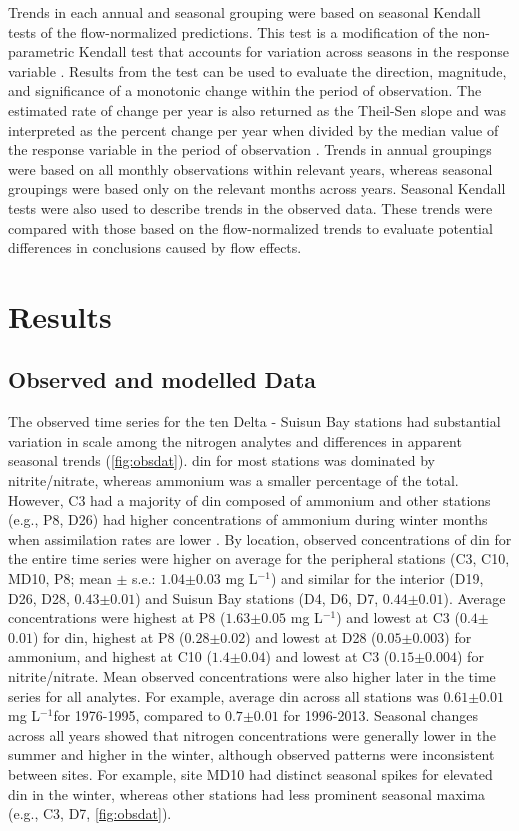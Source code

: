 \documentclass[letterpaper,12pt,oneside]{article}\usepackage[]{graphicx}\usepackage[]{color}
\newcommand{\mgl}{mg L$^{-1}$}
\begin{document}
Trends in each annual and seasonal grouping were based on seasonal Kendall tests of the flow-normalized predictions. This test is a modification of the non-parametric Kendall test that accounts for variation across seasons in the response variable \citep{Hirsch82,Millard13}.  Results from the test can be used to evaluate the direction, magnitude, and significance of a monotonic change within the period of observation.  The estimated rate of change per year is also returned as the Theil-Sen slope and was interpreted as the percent change per year when divided by the median value of the response variable in the period of observation \citep{Jassby08}.  Trends in annual groupings were based on all monthly observations within relevant years, whereas seasonal groupings were based only on the relevant months across years.  Seasonal Kendall tests were also used to describe trends in the observed data.  These trends were compared with those based on the flow-normalized trends to evaluate potential differences in conclusions caused by flow effects.

\section{Results}

\subsection{Observed and modelled Data}



The observed time series for the ten Delta - Suisun Bay stations had substantial variation in scale among the nitrogen analytes and differences in apparent seasonal trends (\cref{fig:obsdat}).  \ac{din} for most stations was dominated by nitrite/nitrate, whereas ammonium was a smaller percentage of the total.  However, C3 had a majority of \ac{din} composed of ammonium and other stations (e.g., P8, D26) had higher concentrations of ammonium during winter months when assimilation rates are lower \citep{Novick15}.  By location, observed concentrations of \ac{din} for the entire time series were higher on average for the peripheral stations (C3, C10, MD10, P8; mean $\pm$ s.e.: $1.04$$\pm$$0.03$ \mgl) and similar for the interior (D19, D26, D28, $0.43$$\pm$$0.01$) and Suisun Bay stations (D4, D6, D7, $0.44$$\pm$$0.01$).  Average concentrations were highest at P8 ($1.63$$\pm$$0.05$ \mgl) and lowest at C3 ($0.4$$\pm$$0.01$) for \ac{din}, highest at P8 ($0.28$$\pm$$0.02$) and lowest at D28 ($0.05$$\pm$$0.003$) for ammonium, and highest at C10 ($1.4$$\pm$$0.04$) and lowest at C3 ($0.15$$\pm$$0.004$) for nitrite/nitrate. Mean observed concentrations were also higher later in the time series for all analytes.  For example, average \ac{din} across all stations was $0.61$$\pm$$0.01$ \mgl for 1976-1995, compared to $0.7$$\pm$$0.01$ for 1996-2013. Seasonal changes across all years showed that nitrogen concentrations were generally lower in the summer and higher in the winter, although observed patterns were inconsistent between sites.  For example, site MD10 had distinct seasonal spikes for elevated \ac{din} in the winter, whereas other stations had less prominent seasonal maxima (e.g., C3, D7, \cref{fig:obsdat}).  
\end{document}
